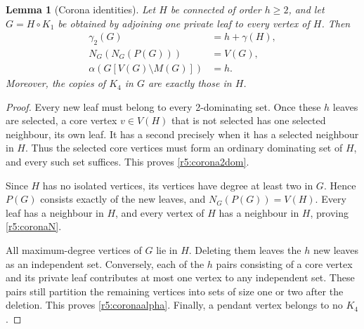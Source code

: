 \documentclass[11pt,a4paper]{article}
\newtheorem{lemma}[theorem]{Lemma}
\theoremstyle{remark}
\begin{document}
\begin{lemma}[Corona identities]\label{r5:corona}
Let \(H\) be connected of order \(h\ge2\), and let \(G=H\circ K_1\)
be obtained by adjoining one private leaf to every vertex of \(H\).
Then
\begin{align}
\gamma_2(G)&=h+\gamma(H),\label{r5:corona2dom}\\
N_G(N_G(P(G)))&=V(G),\label{r5:coronaN}\\
\alpha\!\left(G[V(G)\setminus M(G)]\right)&=h.\label{r5:coronaalpha}
\end{align}
Moreover, the copies of \(K_4\) in \(G\) are exactly those in \(H\).
\end{lemma}
\begin{proof}
Every new leaf must belong to every 2-dominating set. Once these
\(h\) leaves are selected, a core vertex \(v\in V(H)\) that is not
selected has one selected neighbour, its own leaf. It has a second
precisely when it has a selected neighbour in \(H\). Thus the selected
core vertices must form an ordinary dominating set of \(H\), and
every such set suffices. This proves \eqref{r5:corona2dom}.

Since \(H\) has no isolated vertices, its vertices have degree at
least two in \(G\). Hence \(P(G)\) consists exactly of the new
leaves, and \(N_G(P(G))=V(H)\). Every leaf has a neighbour in \(H\),
and every vertex of \(H\) has a neighbour in \(H\), proving
\eqref{r5:coronaN}.

All maximum-degree vertices of \(G\) lie in \(H\). Deleting them
leaves the \(h\) new leaves as an independent set. Conversely, each
of the \(h\) pairs consisting of a core vertex and its private leaf
contributes at most one vertex to any independent set. These pairs
still partition the remaining vertices into sets of size one or
two after the deletion. This proves \eqref{r5:coronaalpha}.
Finally, a pendant vertex belongs to no \(K_4\).
\end{proof}
\end{document}
